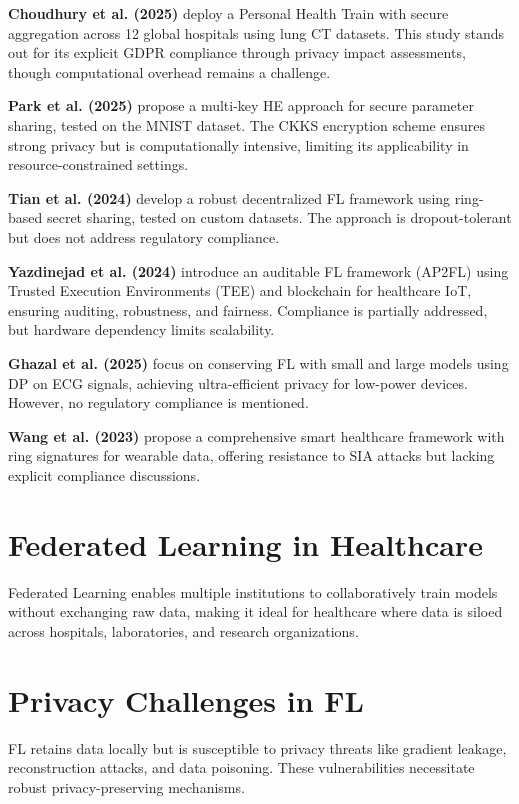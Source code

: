 \documentclass[12pt]{report}
\begin{document}
\textbf{Choudhury et al. (2025)} \cite{choudhury2025} deploy a Personal Health Train with secure aggregation across 12 global hospitals using lung CT datasets. This study stands out for its explicit GDPR compliance through privacy impact assessments, though computational overhead remains a challenge.

\textbf{Park et al. (2025)} \cite{park2025} propose a multi-key HE approach for secure parameter sharing, tested on the MNIST dataset. The CKKS encryption scheme ensures strong privacy but is computationally intensive, limiting its applicability in resource-constrained settings.

\textbf{Tian et al. (2024)} \cite{tian2024} develop a robust decentralized FL framework using ring-based secret sharing, tested on custom datasets. The approach is dropout-tolerant but does not address regulatory compliance.

\textbf{Yazdinejad et al. (2024)} \cite{yazdinejad2024} introduce an auditable FL framework (AP2FL) using Trusted Execution Environments (TEE) and blockchain for healthcare IoT, ensuring auditing, robustness, and fairness. Compliance is partially addressed, but hardware dependency limits scalability.

\textbf{Ghazal et al. (2025)} \cite{ghazal2025} focus on conserving FL with small and large models using DP on ECG signals, achieving ultra-efficient privacy for low-power devices. However, no regulatory compliance is mentioned.

\textbf{Wang et al. (2023)} \cite{wang2023} propose a comprehensive smart healthcare framework with ring signatures for wearable data, offering resistance to SIA attacks but lacking explicit compliance discussions.

\section{Federated Learning in Healthcare}
Federated Learning enables multiple institutions to collaboratively train models without exchanging raw data, making it ideal for healthcare where data is siloed across hospitals, laboratories, and research organizations.

\section{Privacy Challenges in FL}
FL retains data locally but is susceptible to privacy threats like gradient leakage, reconstruction attacks, and data poisoning. These vulnerabilities necessitate robust privacy-preserving mechanisms.
\end{document}
